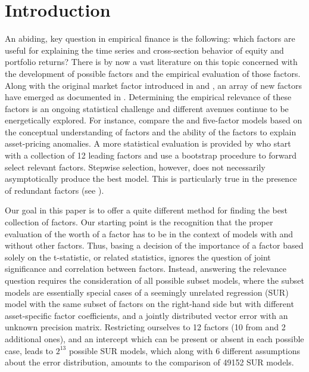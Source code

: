 \section{Introduction}
An abiding, key question in empirical finance is the following: which factors are useful for explaining the time series and cross-section behavior of equity and portfolio returns? There is by now a vast literature on this topic concerned with the development of possible factors and the empirical evaluation of those factors. 
Along with the original market factor introduced in \cite{sharpe1964capital} and \cite{lintner1965valuation}, an array of new factors have emerged as documented in \cite{harvey2015and}. 
Determining the empirical relevance of these factors is an ongoing statistical challenge and different avenues continue to be energetically explored. 
For instance, \cite{hou2014comparison} compare the \cite{hou2014digesting} and   \cite{fama2015five} five-factor models based on the conceptual understanding of factors and the ability of the factors to explain asset-pricing anomalies.  
A more statistical evaluation is provided by \cite{harvey2015lucky} who start with a collection of 12 leading factors and use a bootstrap procedure to forward select relevant factors. 
Stepwise selection, however, does not necessarily asymptotically produce the best model. 
This is particularly true in the presence of redundant factors (see \cite{judd2011data}). 

Our goal in this paper is to offer a quite different method for finding the best collection of factors. 
Our starting point is the recognition that the proper evaluation of the worth of a factor has to be in the context of models with and without other factors. 
Thus, basing a decision of the importance of a factor based solely on the t-statistic, or related statistics, ignores the question of joint significance and correlation between factors. 
Instead, answering the relevance question requires the consideration of all possible subset models, where the subset models are essentially special cases of a seemingly unrelated regression (SUR) model with the same subset of factors on the right-hand side but with different asset-specific factor coefficients, and a jointly distributed vector error with an unknown precision matrix. Restricting ourselves to 12 factors (10 from \cite{harvey2015lucky} and 2 additional ones), 
  and an intercept which can be present or absent in each possible case, leads to $2^{13}$ possible SUR models, which along with 6 different assumptions about the error distribution, amounts to the comparison of 49152 SUR models.
  
